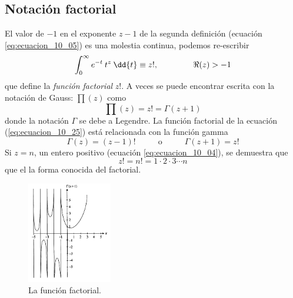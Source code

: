 \subsection{Notación factorial}
El valor de $-1$ en el exponente $z-1$ de la segunda definición (ecuación \ref{eq:ecuacion_10_05}) es una molestia continua, podemos re-escribir
\begin{equation}
\int_{0}^{\infty} e^{-t} \: t^{z} \: \dd{t} \equiv z!,  \hspace{1.5cm} \Re (z) > -1
\label{eq:ecuacion_10_25}
\end{equation}
que define la \emph{función factorial} $z!$. A veces se puede encontrar escrita con la notación de Gauss: $\prod (z)$ como
\begin{equation}
\prod(z) = z! = \Gamma (z + 1)
\label{eq:ecuacion_10_26}
\end{equation}
donde la notación $\Gamma$ se debe a Legendre. La función factorial de la ecuación (\ref{eq:ecuacion_10_25}) está relacionada con la función gamma
\begin{equation}
\Gamma (z) = (z-1)! \hspace{1cm} \mbox{ o } \hspace{1cm} \Gamma (z + 1) = z!
\label{eq:ecuacion_10_27}
\end{equation}
Si $z = n$, un entero positivo (ecuación \ref{eq:ecuacion_10_04}), se demuestra que
\begin{equation}
z! = n! = 1 \cdot 2 \cdot 3 \cdots n
\label{eq:ecuacion_10_28}
\end{equation}
que el la forma conocida del factorial.

\begin{figure}
    \centering
    \includegraphics[width=0.33\textwidth]{Imagenes/FuncionFactorial_01.png}
    \caption{La función factorial.}
    \label{fig:figura_10_01}
\end{figure}


